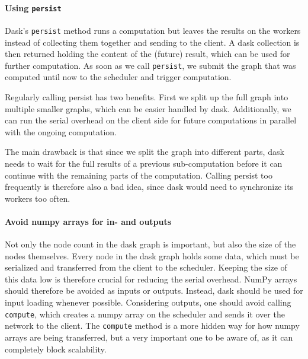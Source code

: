 \paragraph{Using \lstinline{persist}}

Dask's \lstinline{persist} method runs a computation but leaves the results on the workers instead of collecting them together and sending to the client.
A dask collection is then returned holding the content of the (future) result, which can be used for further computation.
As soon as we call \lstinline{persist}, we submit the graph that was computed until now to the scheduler and trigger computation.

Regularly calling persist has two benefits.
First we split up the full graph into multiple smaller graphs, which can be easier handled by dask.
Additionally, we can run the serial overhead on the client side for future computations in parallel with the ongoing computation.

The main drawback is that since we split the graph into different parts, dask needs to wait for the full results of a previous sub-computation before it can continue with the remaining parts of the computation.
Calling persist too frequently is therefore also a bad idea, since dask would need to synchronize its workers too often.

\paragraph{Avoid numpy arrays for in- and outputs}

Not only the node count in the dask graph is important, but also the size of the nodes themselves.
Every node in the dask graph holds some data, which must be serialized and transferred from the client to the scheduler. Keeping the size of this data low is therefore crucial for reducing the serial overhead.
NumPy arrays should therefore be avoided as inputs or outputs.
Instead, dask should be used for input loading whenever possible.
Considering outputs, one should avoid calling \lstinline{compute}, which creates a numpy array on the scheduler and sends it over the network to the client.
The \lstinline{compute} method is a more hidden way for how numpy arrays are being transferred, but a very important one to be aware of, as it can completely block scalability.
